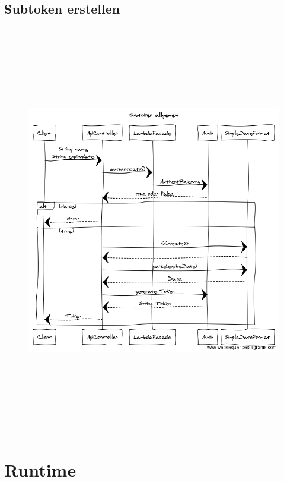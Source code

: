 \documentclass[a4paper,20pt,oneside]{book}
\begin{document}
	\subsection{Subtoken erstellen}
	\begin{figure}[!hb]
    \includegraphics[width=18cm,height=18cm]	{Subtoken}
	\end{figure}
	\newpage
	\section{Runtime}
\end{document}
